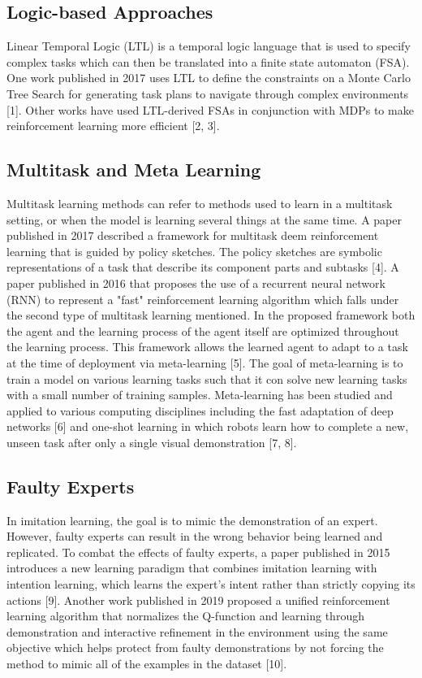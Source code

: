 \documentclass[letterpaper, 10 pt, conference]{ieeeconf}  %
\begin{document}
\subsection{Logic-based Approaches}

Linear Temporal Logic (LTL) is a temporal logic language that is used to specify complex tasks which can then be translated into a finite state automaton (FSA). One work published in 2017 uses LTL to define the constraints on a Monte Carlo Tree Search for generating task plans to navigate through complex environments [1]. Other works have used LTL-derived FSAs in conjunction with MDPs to make reinforcement learning more efficient [2, 3].

\subsection{Multitask and Meta Learning}

Multitask learning methods can refer to methods used to learn in a multitask setting, or when the model is learning several things at the same time. A paper published in 2017 described a framework for multitask deem reinforcement learning that is guided by policy sketches. The policy sketches are symbolic representations of a task that describe its component parts and subtasks [4]. A paper published in 2016 that proposes the use of a recurrent neural network (RNN) to represent a "fast" reinforcement learning algorithm which falls under the second type of multitask learning mentioned. In the proposed framework both the agent and the learning process of the agent itself are optimized throughout the learning process. This framework allows the learned agent to adapt to a task at the time of deployment via meta-learning [5].
\newline 
\indent The goal of meta-learning is to train a model on various learning tasks such that it con solve new learning tasks with a small number of training samples. Meta-learning has been studied and applied to various computing disciplines including the fast adaptation of deep networks [6] and one-shot learning in which robots learn how to complete a new, unseen task after only a single visual demonstration [7, 8]. 

\subsection{Faulty Experts}

In imitation learning, the goal is to mimic the demonstration of an expert. However, faulty experts can result in the wrong behavior being learned and replicated. To combat the effects of faulty experts, a paper published in 2015 introduces a new learning paradigm that combines imitation learning with intention learning, which learns the expert's intent rather than strictly copying its actions [9]. Another work published in 2019 proposed a unified reinforcement learning algorithm that normalizes the Q-function and learning through demonstration and interactive refinement in the environment using the same objective which helps protect from faulty demonstrations by not forcing the method to mimic all of the examples in the dataset [10].
\end{document}

